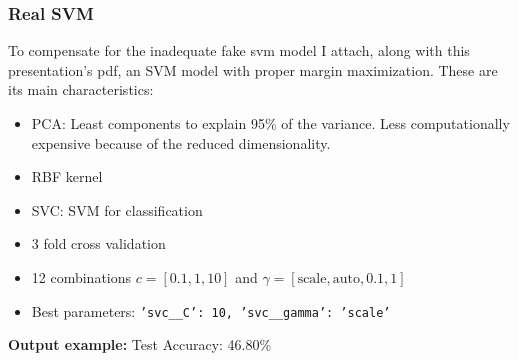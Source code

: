 \begin{frame}
    \frametitle{Real SVM}
    To compensate for the inadequate fake svm model I attach, along with this presentation's pdf,
    an SVM model with proper margin maximization. These are its main characteristics:
    \begin{itemize}
        \item PCA: Least components to explain 95\% of the variance. Less computationally
        expensive because of the reduced dimensionality.
        \item RBF kernel
        \item SVC: SVM for classification
        \item 3 fold cross validation
        \item 12 combinations $c=[0.1, 1, 10]$ and $\gamma=[\text{scale}, \text{auto}, 0.1, 1]$
        \item Best parameters: \texttt{'svc\_\_C': 10, 'svc\_\_gamma': 'scale'}
    \end{itemize}
    \textbf{Output example:} Test Accuracy: 46.80\%
\end{frame}
